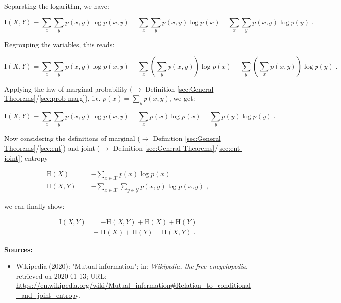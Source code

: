 \documentclass[a4paper,12pt,twoside]{book}
\begin{document}
Separating the logarithm, we have:

\begin{equation} \label{eq:dmi-mje-MI-s1}
\mathrm{I}(X,Y) = \sum_x \sum_y p(x,y) \log p(x,y) - \sum_x \sum_y p(x,y) \log p(x) - \sum_x \sum_y p(x,y) \log p(y) \; .
\end{equation}

Regrouping the variables, this reads:

\begin{equation} \label{eq:dmi-mje-MI-s2}
\mathrm{I}(X,Y) = \sum_x \sum_y p(x,y) \log p(x,y) - \sum_x \left( \sum_y p(x,y) \right) \log p(x) - \sum_y \left( \sum_x p(x,y) \right) \log p(y) \; .
\end{equation}

Applying the law of marginal probability ($\rightarrow$ Definition \ref{sec:General Theorems}/\ref{sec:prob-marg}), i.e. $p(x) = \sum_y p(x,y)$, we get:

\begin{equation} \label{eq:dmi-mje-MI-s3}
\mathrm{I}(X,Y) = \sum_x \sum_y p(x,y) \log p(x,y) - \sum_x p(x) \log p(x) - \sum_y p(y) \log p(y) \; .
\end{equation}

Now considering the definitions of marginal ($\rightarrow$ Definition \ref{sec:General Theorems}/\ref{sec:ent}) and joint ($\rightarrow$ Definition \ref{sec:General Theorems}/\ref{sec:ent-joint}) entropy

\begin{equation} \label{eq:dmi-mje-ME-JE}
\begin{split}
\mathrm{H}(X) &= - \sum_{x \in \mathcal{X}} p(x) \log p(x) \\
\mathrm{H}(X,Y) &= - \sum_{x \in \mathcal{X}} \sum_{y \in \mathcal{Y}} p(x,y) \log p(x,y) \; ,
\end{split}
\end{equation}

we can finally show:

\begin{equation} \label{eq:dmi-mje-MI-qed}
\begin{split}
\mathrm{I}(X,Y) &= - \mathrm{H}(X,Y) + \mathrm{H}(X) + \mathrm{H}(Y) \\
&= \mathrm{H}(X) + \mathrm{H}(Y) - \mathrm{H}(X,Y) \; .
\end{split}
\end{equation}


\vspace{1em}
\textbf{Sources:}
\begin{itemize}
\item Wikipedia (2020): "Mutual information"; in: \textit{Wikipedia, the free encyclopedia}, retrieved on 2020-01-13; URL: \url{https://en.wikipedia.org/wiki/Mutual_information#Relation_to_conditional_and_joint_entropy}.
\end{itemize}
\end{document}
